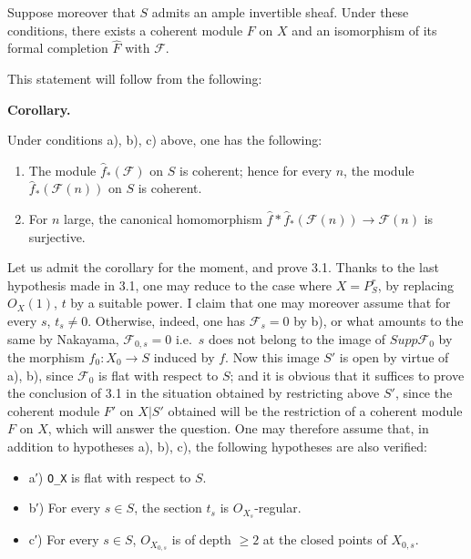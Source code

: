 \documentclass[
]{article}
\providecommand{\tightlist}{%
  \setlength{\itemsep}{0pt}\setlength{\parskip}{0pt}}
\begin{document}
Suppose moreover that \(S\) admits an ample invertible sheaf. Under
these conditions, there exists a coherent module \(F\) on \(X\) and an
isomorphism of its formal completion \(\hat{F}\) with \(\mathcal{F}\).

This statement will follow from the following:

\textbf{Corollary.}

Under conditions a), b), c) above, one has the following:

\begin{enumerate}
\def\labelenumi{\arabic{enumi}.}
\item
  The module \(\hat{f}_{\ast}(\mathcal{F})\) on \(S\) is coherent; hence
  for every \(n\), the module \(\hat{f}_{\ast}(\mathcal{F}(n))\) on
  \(S\) is coherent.
\item
  For \(n\) large, the canonical homomorphism
  \(\hat{f}*\hat{f}_{\ast}(\mathcal{F}(n)) \to \mathcal{F}(n)\) is
  surjective.
\end{enumerate}

Let us admit the corollary for the moment, and prove 3.1. Thanks to the
last hypothesis made in 3.1, one may reduce to the case where
\(X = P^{r}_{S}\), by replacing \(O_{X}(1)\), \(t\) by a suitable power.
I claim that one may moreover assume that for every \(s\),
\(t_{s} \neq 0\). Otherwise, indeed, one has \(\mathcal{F}_{s} = 0\) by
b), or what amounts to the same by Nakayama, \(\mathcal{F}_{0,s} = 0\)
i.e.~\(s\) does not belong to the image of \(Supp \mathcal{F}_{0}\) by
the morphism \(f_{0}: X_{0} \to S\) induced by \(f\). Now this image
\(S'\) is open by virtue of a), b), since \(\mathcal{F}_{0}\) is flat
with respect to \(S\); and it is obvious that it suffices to prove the
conclusion of 3.1 in the situation obtained by restricting above \(S'\),
since the coherent module \(F'\) on \(X|S'\) obtained will be the
restriction of a coherent module \(F\) on \(X\), which will answer the
question. One may therefore assume that, in addition to hypotheses a),
b), c), the following hypotheses are also verified:

\begin{itemize}
\tightlist
\item
  a′) \texttt{O\_X} is flat with respect to \(S\).
\item
  b′) For every \(s \in S\), the section \(t_{s}\) is
  \(O_{X_{s}}\)-regular.
\item
  c′) For every \(s \in S\), \(O_{X_{0,s}}\) is of depth \(\geqslant 2\)
  at the closed points of \(X_{0,s}\).
\end{itemize}
\end{document}
